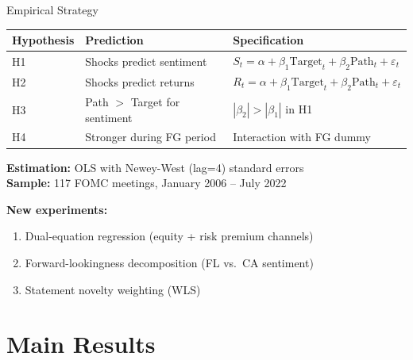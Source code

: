 \documentclass[aspectratio=169, 11pt]{beamer}
\begin{document}
\begin{frame}{Empirical Strategy}
  \centering
  \begin{tabular}{lll}
    \toprule
    Hypothesis & Prediction & Specification \\
    \midrule
    H1 & Shocks predict sentiment & $S_t = \alpha + \beta_1 \text{Target}_t + \beta_2 \text{Path}_t + \varepsilon_t$ \\
    H2 & Shocks predict returns & $R_t = \alpha + \beta_1 \text{Target}_t + \beta_2 \text{Path}_t + \varepsilon_t$ \\
    H3 & Path $>$ Target for sentiment & $|\beta_2| > |\beta_1|$ in H1 \\
    H4 & Stronger during FG period & Interaction with FG dummy \\
    \bottomrule
  \end{tabular}

  \vspace{0.8em}
  \textbf{Estimation:} OLS with Newey-West (lag=4) standard errors\\
  \textbf{Sample:} 117 FOMC meetings, January 2006 -- July 2022

  \vspace{0.5em}
  \textbf{New experiments:}
  \begin{enumerate}
    \item Dual-equation regression (equity + risk premium channels)
    \item Forward-lookingness decomposition (FL vs.\ CA sentiment)
    \item Statement novelty weighting (WLS)
  \end{enumerate}
\end{frame}

\section{Main Results}
\end{document}
